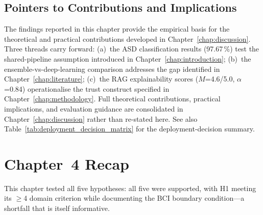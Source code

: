 \fi %


\subsection{Pointers to Contributions and Implications}

The findings reported in this chapter provide the empirical basis for the theoretical and practical contributions developed in Chapter~\ref{chap:discussion}. Three threads carry forward: (a)~the ASD classification results (97.67\,\%) test the shared-pipeline assumption introduced in Chapter~\ref{chap:introduction}; (b)~the ensemble-vs-deep-learning comparison addresses the gap identified in Chapter~\ref{chap:literature}; (c)~the RAG explainability scores ($M$=4.6/5.0, $\alpha$=0.84) operationalise the trust construct specified in Chapter~\ref{chap:methodology}. Full theoretical contributions, practical implications, and evaluation guidance are consolidated in Chapter~\ref{chap:discussion} rather than re-stated here. See also Table~\ref{tab:deployment_decision_matrix} for the deployment-decision summary.


\iffalse
\section{Chapter~4 Recap}

This chapter tested all five hypotheses: all five were supported, with H1 meeting its $\geq$4 domain criterion while documenting the BCI boundary condition---a shortfall that is itself informative.

